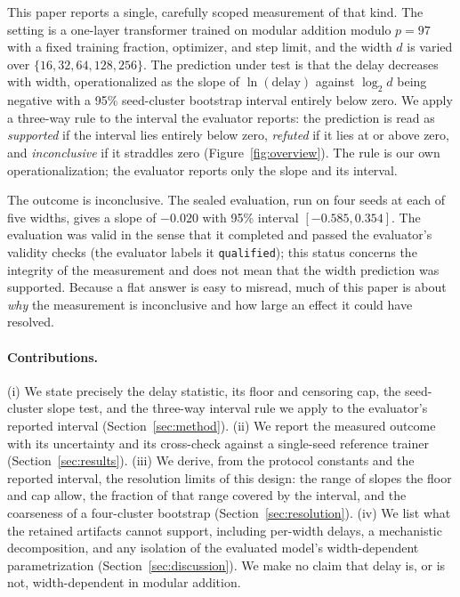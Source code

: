 \documentclass{article}
\begin{document}
This paper reports a single, carefully scoped measurement of that kind. The setting is a one-layer transformer trained on modular addition modulo $p=97$ with a fixed training fraction, optimizer, and step limit, and the width $d$ is varied over $\{16,32,64,128,256\}$. The prediction under test is that the delay decreases with width, operationalized as the slope of $\ln(\text{delay})$ against $\log_2 d$ being negative with a 95\% seed-cluster bootstrap interval entirely below zero. We apply a three-way rule to the interval the evaluator reports: the prediction is read as \emph{supported} if the interval lies entirely below zero, \emph{refuted} if it lies at or above zero, and \emph{inconclusive} if it straddles zero (Figure~\ref{fig:overview}). The rule is our own operationalization; the evaluator reports only the slope and its interval.

The outcome is inconclusive. The sealed evaluation, run on four seeds at each of five widths, gives a slope of $-0.020$ with 95\% interval $[-0.585, 0.354]$. The evaluation was valid in the sense that it completed and passed the evaluator's validity checks (the evaluator labels it \texttt{qualified}); this status concerns the integrity of the measurement and does not mean that the width prediction was supported. Because a flat answer is easy to misread, much of this paper is about \emph{why} the measurement is inconclusive and how large an effect it could have resolved.

\paragraph{Contributions.} (i) We state precisely the delay statistic, its floor and censoring cap, the seed-cluster slope test, and the three-way interval rule we apply to the evaluator's reported interval (Section~\ref{sec:method}). (ii) We report the measured outcome with its uncertainty and its cross-check against a single-seed reference trainer (Section~\ref{sec:results}). (iii) We derive, from the protocol constants and the reported interval, the resolution limits of this design: the range of slopes the floor and cap allow, the fraction of that range covered by the interval, and the coarseness of a four-cluster bootstrap (Section~\ref{sec:resolution}). (iv) We list what the retained artifacts cannot support, including per-width delays, a mechanistic decomposition, and any isolation of the evaluated model's width-dependent parametrization (Section~\ref{sec:discussion}). We make no claim that delay is, or is not, width-dependent in modular addition.
\end{document}
